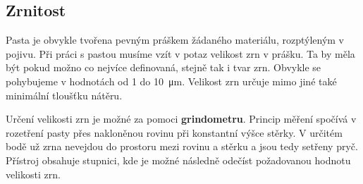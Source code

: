 \documentclass{protokol}
\begin{document}
    \subsection{Zrnitost}
      Pasta je obvykle tvořena pevným práškem žádaného materiálu, rozptýleným v pojivu. Při práci s pastou musíme vzít v potaz velikost zrn v prášku. Ta by měla být pokud možno co nejvíce definovaná, stejně tak i tvar zrn. 
      Obvykle se pohybujeme v hodnotách od 1 do \qty{10}{\micro\meter}. Velikost zrn určuje mimo jiné také minimální tloušťku nátěru. 
      
      Určení velikosti zrn je možné za pomoci \textbf{grindometru}. Princip měření spočívá v rozetření pasty přes nakloněnou rovinu při konstantní výšce stěrky. V určitém bodě už zrna nevejdou do prostoru mezi rovinu a stěrku a jsou tedy setřeny pryč. Přístroj obsahuje stupnici, kde je možné následně odečíst požadovanou hodnotu velikosti zrn. 
	



% 

% 

% 
\end{document}
